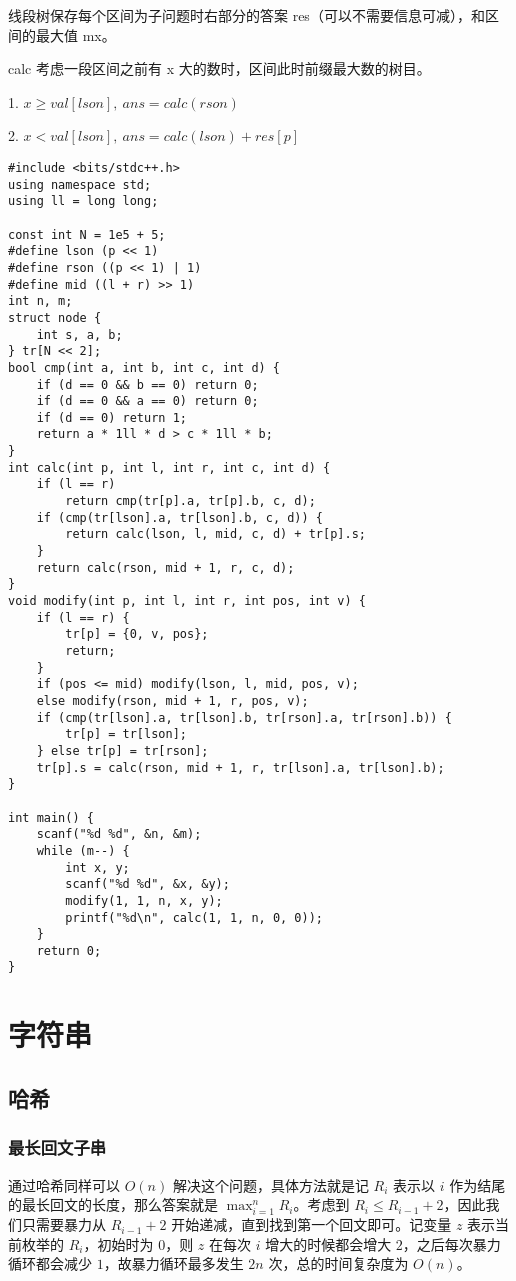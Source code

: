 \documentclass[a4paper]{article}
\begin{document}
线段树保存每个区间为子问题时右部分的答案 res（可以不需要信息可减），和区间的最大值 mx。

calc 考虑一段区间之前有 x 大的数时，区间此时前缀最大数的树目。

1. $x \geq val[lson],\ ans = calc(rson)$

2. $x < val[lson],\ ans = calc(lson) + res[p]$

\begin{lstlisting}
#include <bits/stdc++.h>
using namespace std;
using ll = long long;

const int N = 1e5 + 5;
#define lson (p << 1)
#define rson ((p << 1) | 1)
#define mid ((l + r) >> 1)
int n, m;
struct node {
    int s, a, b;
} tr[N << 2];
bool cmp(int a, int b, int c, int d) {
    if (d == 0 && b == 0) return 0;
    if (d == 0 && a == 0) return 0;
    if (d == 0) return 1;
    return a * 1ll * d > c * 1ll * b; 
}
int calc(int p, int l, int r, int c, int d) {
    if (l == r) 
        return cmp(tr[p].a, tr[p].b, c, d);
    if (cmp(tr[lson].a, tr[lson].b, c, d)) {
        return calc(lson, l, mid, c, d) + tr[p].s;
    }
    return calc(rson, mid + 1, r, c, d);
}
void modify(int p, int l, int r, int pos, int v) {
    if (l == r) {
        tr[p] = {0, v, pos};
        return;
    }
    if (pos <= mid) modify(lson, l, mid, pos, v);
    else modify(rson, mid + 1, r, pos, v);
    if (cmp(tr[lson].a, tr[lson].b, tr[rson].a, tr[rson].b)) {
        tr[p] = tr[lson];
    } else tr[p] = tr[rson];
    tr[p].s = calc(rson, mid + 1, r, tr[lson].a, tr[lson].b);
}

int main() {
    scanf("%d %d", &n, &m);
    while (m--) {
        int x, y;
        scanf("%d %d", &x, &y);
        modify(1, 1, n, x, y);
        printf("%d\n", calc(1, 1, n, 0, 0));
    }
    return 0;
}
\end{lstlisting}

\section{字符串}
\subsection{哈希}
\subsubsection{最长回文子串}
通过哈希同样可以 $O(n)$ 解决这个问题，具体方法就是记 $R_i$ 表示以 $i$ 作为结尾的最长回文的长度，那么答案就是 $\max_{i=1}^nR_i$。考虑到 $R_i\leq R_{i-1}+2$，因此我们只需要暴力从 $R_{i-1}+2$ 开始递减，直到找到第一个回文即可。记变量 $z$ 表示当前枚举的 $R_i$，初始时为 $0$，则 $z$ 在每次 $i$ 增大的时候都会增大 $2$，之后每次暴力循环都会减少 $1$，故暴力循环最多发生 $2n$ 次，总的时间复杂度为 $O(n)$。
\end{document}
